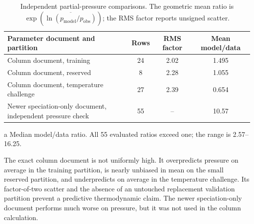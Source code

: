 \begin{table}[htbp]
    \centering
    \caption{Independent  partial-pressure comparisons. The geometric mean ratio is $\exp(\overline{\ln(p_{\mathrm{model}}/p_{\mathrm{obs}})})$; the RMS factor reports unsigned scatter.}
    \label{tab:pressure-consistency}
    \begin{threeparttable}
        \small
        \setlength{\tabcolsep}{4pt}
        \begin{tabularx}{0.98\textwidth}{@{}>{\raggedright\arraybackslash}X S[table-format=2.0] S[table-format=2.2] S[table-format=2.3]@{}}
            \toprule
            Parameter document and partition & {Rows} & {RMS factor} & {Mean model/data} \\
            \midrule
            Column document, training & 24 & 2.02 & 1.495 \\
            Column document, reserved & 8 & 2.28 & 1.055 \\
            Column document, temperature challenge & 27 & 2.39 & 0.654 \\
            Newer speciation-only document, independent pressure check & 55 & {--} & 10.57 \\
            \bottomrule
        \end{tabularx}
        \begin{tablenotes}\footnotesize
            \item[a] Median model/data ratio. All 55 evaluated ratios exceed one; the range is 2.57--16.25.
        \end{tablenotes}
    \end{threeparttable}
\end{table}

The exact column document is not uniformly high.  It overpredicts pressure on
average in the training partition, is nearly unbiased in mean on the small
reserved partition, and underpredicts on average in the temperature challenge.
Its factor-of-two scatter and the absence of an untouched replacement
validation partition prevent a predictive thermodynamic claim.  The newer
speciation-only document performs much worse on pressure, but it was not used
in the column calculation.

